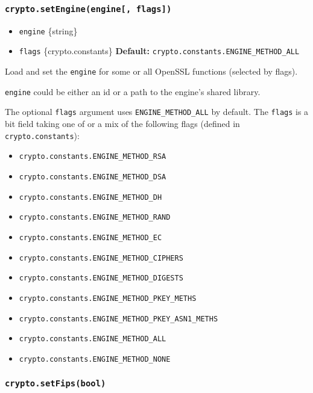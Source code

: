 \subsubsection{\texorpdfstring{\texttt{crypto.setEngine(engine{[},\ flags{]})}}{crypto.setEngine(engine{[}, flags{]})}}\label{crypto.setengineengine-flags}

\begin{itemize}
\tightlist
\item
  \texttt{engine} \{string\}
\item
  \texttt{flags} \{crypto.constants\} \textbf{Default:}
  \texttt{crypto.constants.ENGINE\_METHOD\_ALL}
\end{itemize}

Load and set the \texttt{engine} for some or all OpenSSL functions
(selected by flags).

\texttt{engine} could be either an id or a path to the engine's shared
library.

The optional \texttt{flags} argument uses \texttt{ENGINE\_METHOD\_ALL}
by default. The \texttt{flags} is a bit field taking one of or a mix of
the following flags (defined in \texttt{crypto.constants}):

\begin{itemize}
\tightlist
\item
  \texttt{crypto.constants.ENGINE\_METHOD\_RSA}
\item
  \texttt{crypto.constants.ENGINE\_METHOD\_DSA}
\item
  \texttt{crypto.constants.ENGINE\_METHOD\_DH}
\item
  \texttt{crypto.constants.ENGINE\_METHOD\_RAND}
\item
  \texttt{crypto.constants.ENGINE\_METHOD\_EC}
\item
  \texttt{crypto.constants.ENGINE\_METHOD\_CIPHERS}
\item
  \texttt{crypto.constants.ENGINE\_METHOD\_DIGESTS}
\item
  \texttt{crypto.constants.ENGINE\_METHOD\_PKEY\_METHS}
\item
  \texttt{crypto.constants.ENGINE\_METHOD\_PKEY\_ASN1\_METHS}
\item
  \texttt{crypto.constants.ENGINE\_METHOD\_ALL}
\item
  \texttt{crypto.constants.ENGINE\_METHOD\_NONE}
\end{itemize}

\subsubsection{\texorpdfstring{\texttt{crypto.setFips(bool)}}{crypto.setFips(bool)}}\label{crypto.setfipsbool}

